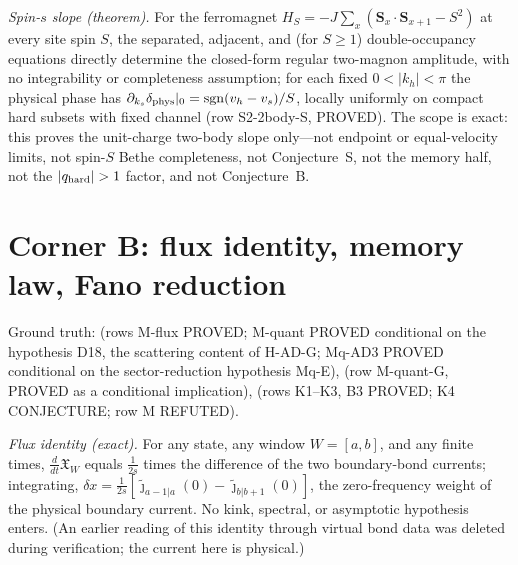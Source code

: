 \documentclass[aps,prl,twocolumn,superscriptaddress,longbibliography,floatfix]{revtex4-2}
\begin{document}
\emph{Spin-$s$ slope (theorem).} For the ferromagnet
$H_S=-J\sum_x(\mathbf{S}_x\!\cdot\!\mathbf{S}_{x+1}-S^2)$ at every site
spin $S$, the separated, adjacent, and (for $S\ge1$) double-occupancy
equations directly determine the closed-form regular two-magnon amplitude,
with no
integrability or completeness assumption; for each fixed $0<|k_h|<\pi$ the
physical phase has
$\partial_{k_s}\delta_{\rm phys}|_0=\mathrm{sgn}(v_h-v_s)/S$, locally
uniformly on compact hard subsets with fixed channel (row S2-2body-S,
PROVED). The scope is exact: this proves the unit-charge two-body slope
only---not endpoint or equal-velocity limits, not spin-$S$ Bethe
completeness, not Conjecture~S, not the memory half, not the
$|q_{\rm hard}|>1$ factor, and not Conjecture~B.

\section{Corner B: flux identity, memory law, Fano reduction}
\label{app:memory}

\begingroup\raggedright
Ground truth:  (rows M-flux PROVED;
M-quant PROVED conditional on the hypothesis D18, the scattering content
of H-AD-G; Mq-AD3 PROVED
conditional on the sector-reduction hypothesis Mq-E),
 (row M-quant-G, PROVED as a
conditional implication),  (rows K1--K3,
B3 PROVED; K4 CONJECTURE; row M REFUTED).
\par\endgroup

\emph{Flux identity (exact).} For any state, any window $W=[a,b]$, and any
finite times, $\frac{d}{dt}\mathfrak{X}_W$ equals $\frac{1}{2s}$ times the
difference of the two boundary-bond currents; integrating,
$\delta x=\frac{1}{2s}[\tilde{\jmath}_{a-1|a}(0)-\tilde{\jmath}_{b|b+1}(0)]$,
the zero-frequency weight of the physical boundary current. No kink,
spectral, or asymptotic hypothesis enters. (An earlier reading of this
identity through virtual bond data was deleted during verification; the
current here is physical.)
\end{document}

